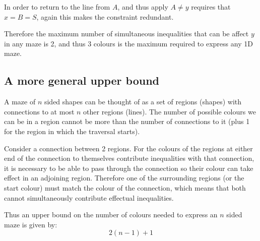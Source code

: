 \documentclass[10pt,twocolumn]{article}
\begin{document}
In order to return to the line from $A$, and thus apply $A \neq y$ requires
that $x = B = S$, again this makes the constraint redundant.

Therefore the maximum number of simultaneous inequalities that can be affect
$y$ in any maze is 2, and thus 3 colours is the maximum required to express
any 1D maze.

\subsection{A more general upper bound}
A maze of $n$ sided shapes can be thought of as a set of regions (shapes) with connections to at most $n$ other regions (lines).
The number of possible colours we can be in a region cannot be more than the number of connections to it (plus 1 for the region in which the traversal starts).

Consider a connection between 2 regions.
For the colours of the regions at either end of the connection to themselves contribute inequalities with that connection, it is necessary to be able to pass through the connection so their colour can take effect in an adjoining region.
Therefore one of the surrounding regions (or the start colour) must match the colour of the connection, which means that both cannot simultaneously contribute effectual inequalities.

Thus an upper bound on the number of colours needed to express an $n$ sided maze is given by:
\begin{equation}
2(n - 1) + 1
\end{equation}
\end{document}
